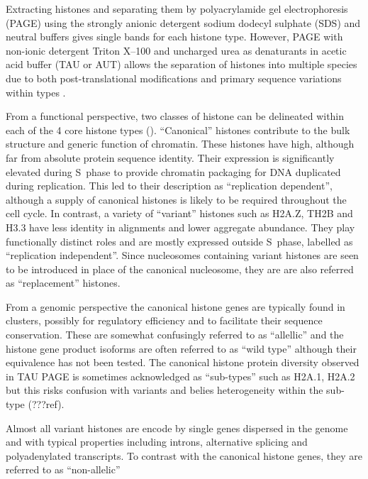   Extracting histones and separating them by polyacrylamide gel electrophoresis (PAGE) 
  using the strongly anionic detergent sodium dodecyl sulphate (SDS) and neutral buffers 
  gives single bands for each histone type. 
  However, PAGE with non-ionic detergent Triton X--100 and uncharged urea as denaturants
  in acetic acid buffer (TAU or AUT) allows the separation of histones into multiple species 
  due to both post-translational modifications and primary sequence variations within types \citep{PAGEND}.

  From a functional perspective, two classes of histone can be delineated 
  within each of the 4 core histone types (). 
  ``Canonical'' histones contribute to the bulk structure and generic function of chromatin. 
  These histones have high, although far from absolute protein sequence identity.
  Their expression is significantly elevated during S~phase to provide chromatin packaging 
  for DNA duplicated during replication. This led to their description as ``replication dependent'', 
  although a supply of canonical histones is likely to be required throughout the cell cycle. 
  In contrast, a variety of ``variant'' histones such as H2A.Z, TH2B and H3.3 
  have less identity in alignments and lower aggregate abundance. 
  They play functionally distinct roles and are mostly expressed outside S~phase, labelled as  ``replication independent''. 
  Since nucleosomes containing variant histones are seen to be introduced in place of the canonical nucleosome, 
  they are are also referred as ``replacement'' histones.
  
  From a genomic perspective the canonical histone genes are typically found in clusters, 
  possibly for regulatory efficiency and to facilitate their sequence conservation. 
  These are somewhat confusingly referred to as ``allellic'' 
  and the histone gene product isoforms are often referred to as ``wild type'' although their equivalence has not been tested.
  The canonical histone protein diversity observed in TAU PAGE is sometimes acknowledged as ``sub-types'' 
  such as H2A.1, H2A.2 but this risks confusion with variants and belies heterogeneity within the sub-type (???ref).

  
  Almost all variant histones are encode by single genes dispersed in the genome 
  and with typical properties including introns, alternative splicing and polyadenylated transcripts. 
  To contrast with the canonical histone genes, they are referred to as ``non-allelic''
  
